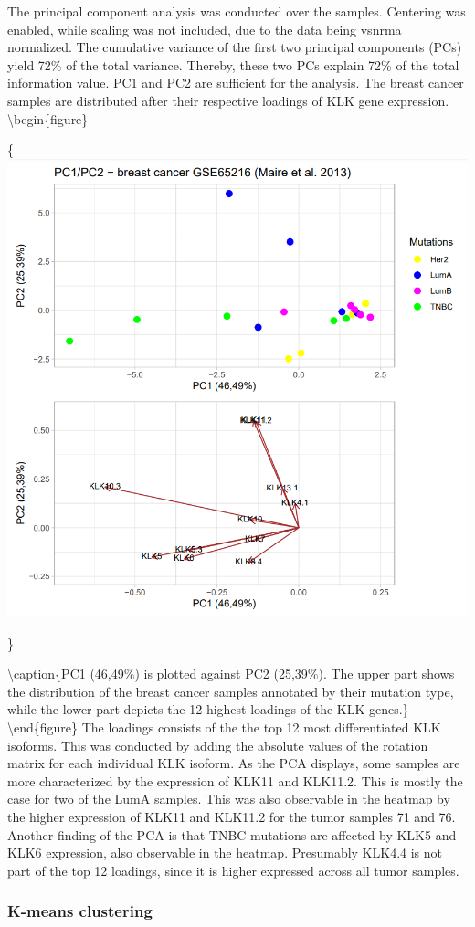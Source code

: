 \documentclass[
]{article}
\begin{document}
The principal component analysis was conducted over the samples.
Centering was enabled, while scaling was not included, due to the data
being vsnrma normalized. The cumulative variance of the first two
principal components (PCs) yield 72\% of the total variance. Thereby,
these two PCs explain 72\% of the total information value. PC1 and PC2
are sufficient for the analysis. The breast cancer samples are
distributed after their respective loadings of KLK gene expression.\\
\textbackslash begin\{figure\}

\{\centering \includegraphics[width=0.5\linewidth]{images/PCAplot_breast}

\}

\textbackslash caption\{PC1 (46,49\%) is plotted against PC2 (25,39\%).
The upper part shows the distribution of the breast cancer samples
annotated by their mutation type, while the lower part depicts the 12
highest loadings of the KLK genes.\}\label{fig:PCA plot - breast }
\textbackslash end\{figure\} The loadings consists of the the top 12
most differentiated KLK isoforms. This was conducted by adding the
absolute values of the rotation matrix for each individual KLK isoform.
As the PCA displays, some samples are more characterized by the
expression of KLK11 and KLK11.2. This is mostly the case for two of the
LumA samples. This was also observable in the heatmap by the higher
expression of KLK11 and KLK11.2 for the tumor samples 71 and 76. Another
finding of the PCA is that TNBC mutations are affected by KLK5 and KLK6
expression, also observable in the heatmap. Presumably KLK4.4 is not
part of the top 12 loadings, since it is higher expressed across all
tumor samples.

\hypertarget{k-means-clustering}{%
\subsubsection{K-means clustering}\label{k-means-clustering}}
\end{document}
